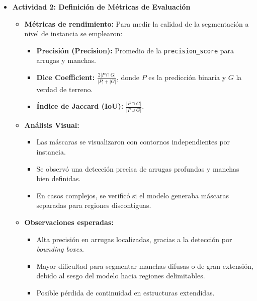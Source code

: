 \begin{enumerate}
\begin{itemize}
    \item \textbf{Actividad 2: Definición de Métricas de Evaluación}
    \begin{itemize}
      \item \textbf{Métricas de rendimiento:} Para medir la calidad de la segmentación a nivel de instancia se emplearon:
      \begin{itemize}
        \item \textbf{Precisión (Precision):} Promedio de la \texttt{precision\_score} para arrugas y manchas.
        \item \textbf{Dice Coefficient:} \(\displaystyle \frac{2|P \cap G|}{|P| + |G|}\), donde \(P\) es la predicción binaria y \(G\) la verdad de terreno.
        \item \textbf{Índice de Jaccard (IoU):} \(\displaystyle \frac{|P \cap G|}{|P \cup G|}\).
      \end{itemize}
  
      \item \textbf{Análisis Visual:}
      \begin{itemize}
        \item Las máscaras se visualizaron con contornos independientes por instancia.
        \item Se observó una detección precisa de arrugas profundas y manchas bien definidas.
        \item En casos complejos, se verificó si el modelo generaba máscaras separadas para regiones discontiguas.
      \end{itemize}
  
      \item \textbf{Observaciones esperadas:}
      \begin{itemize}
        \item Alta precisión en arrugas localizadas, gracias a la detección por \emph{bounding boxes}.
        \item Mayor dificultad para segmentar manchas difusas o de gran extensión, debido al sesgo del modelo hacia regiones delimitables.
        \item Posible pérdida de continuidad en estructuras extendidas.
      \end{itemize}
    \end{itemize}
  

\end{itemize}
\end{enumerate}
